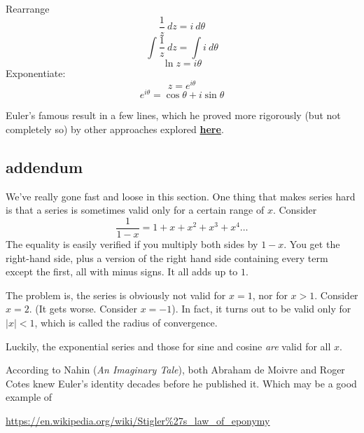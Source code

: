 \documentclass[11pt, oneside]{article}
\begin{document}
Rearrange
\[ \frac{1}{z} \ dz = i \ d \theta \]
\[ \int \frac{1}{z} \ dz = \int i  \ d \theta \]
\[ \ln z = i \theta \]
Exponentiate:
\[ z = e^{i \theta} \]
\[ e^{i \theta} = \cos \theta + i \sin \theta \]

Euler's famous result in a few lines, which he proved more rigorously (but not completely so) by other approaches explored \hyperref[sec:Euler's_equation]{\textbf{here}}.

\subsection*{addendum}
We've really gone fast and loose in this section.  One thing that makes series hard is that a series is sometimes valid only for a certain range of $x$.  Consider
\[ \frac{1}{1 - x} = 1 + x + x^2 + x^3 + x^4 \dots \]
The equality is easily verified if you multiply both sides by $1 - x$.  You get the right-hand side, plus a version of the right hand side containing every term except the first, all with minus signs.  It all adds up to $1$.
 
The problem is, the series is obviously not valid for $x = 1$, nor for $x > 1$.  Consider $x = 2$.  (It gets worse.  Consider $x = -1$).  In fact, it turns out to be valid only for $|x| < 1$, which is called the radius of convergence.

Luckily, the exponential series and those for sine and cosine \emph{are} valid for all $x$.

According to Nahin (\emph{An Imaginary Tale}), both Abraham de Moivre and Roger Cotes knew Euler's identity decades before he published it.  Which may be a good example of

\url{https://en.wikipedia.org/wiki/Stigler%27s_law_of_eponymy}
\end{document}
